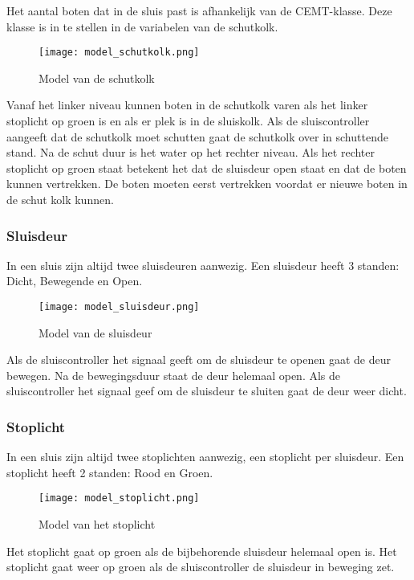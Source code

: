 \documentclass[../verslag.tex]{subfiles}
\begin{document}
Het aantal boten dat in de sluis past is afhankelijk van de CEMT-klasse. Deze klasse is in te stellen in de variabelen van de schutkolk.
\begin{figure}[H]
    \centering
    \texttt{[image: model\_schutkolk.png]}
    \caption{Model van de schutkolk}
\end{figure}

Vanaf het linker niveau kunnen boten in de schutkolk varen als het linker stoplicht op groen is en als er plek is in de sluiskolk. Als de sluiscontroller aangeeft dat de schutkolk moet schutten gaat de schutkolk over in schuttende stand. Na de schut duur is het water op het rechter niveau. Als het rechter stoplicht op groen staat betekent het dat de sluisdeur open staat en dat de boten kunnen vertrekken. De boten moeten eerst vertrekken voordat er nieuwe boten in de schut kolk kunnen.





\subsubsection{Sluisdeur}
In een sluis zijn altijd twee sluisdeuren aanwezig.
Een sluisdeur heeft 3 standen: Dicht, Bewegende en Open.
\begin{figure}[H]
    \centering
    \texttt{[image: model\_sluisdeur.png]}
    \caption{Model van de sluisdeur}
\end{figure}

Als de sluiscontroller het signaal geeft om de sluisdeur te openen gaat de deur bewegen. Na de bewegingsduur staat de deur helemaal open. Als de sluiscontroller het signaal geef om de sluisdeur te sluiten gaat de deur weer dicht.




\subsubsection{Stoplicht}
In een sluis zijn altijd twee stoplichten aanwezig, een stoplicht per sluisdeur.
Een stoplicht heeft 2 standen: Rood en Groen.
\begin{figure}[H]
    \centering
    \texttt{[image: model\_stoplicht.png]}
    \caption{Model van het stoplicht}
\end{figure}

Het stoplicht gaat op groen als de bijbehorende sluisdeur helemaal open is. Het stoplicht gaat weer op groen als de sluiscontroller de sluisdeur in beweging zet.
\end{document}
